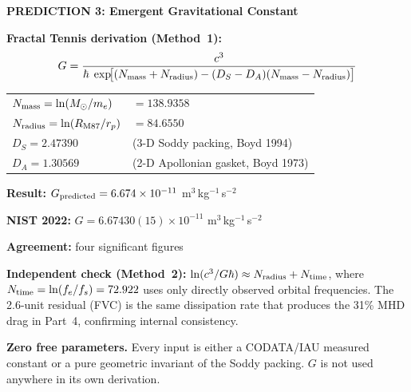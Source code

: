 \documentclass[11pt,a4paper]{article}
\begin{document}
        \begin{mdframed}
        \centering
        \textbf{PREDICTION 3: Emergent Gravitational Constant}

        \vspace{0.5em}

        \textbf{Fractal Tennis derivation (Method~1):}
        \[
        G = \frac{c^3}{\hbar\;\exp\!\bigl[
              (N_{\rm mass}+N_{\rm radius})
              -(D_S-D_A)(N_{\rm mass}-N_{\rm radius})
            \bigr]}
        \]

        \vspace{0.4em}

        \begin{tabular}{ll}
        $N_{\rm mass}   = \ln(M_\odot/m_e)$ & $= 138.9358$ \\
        $N_{\rm radius} = \ln(R_{\rm M87}/r_p)$ & $= 84.6550$ \\
        $D_S = 2.47390$ & (3-D Soddy packing, Boyd 1994) \\
        $D_A = 1.30569$ & (2-D Apollonian gasket, Boyd 1973) \\
        \end{tabular}

        \vspace{0.5em}

        \textbf{Result:}
        $G_{\rm predicted} = 6.674\times10^{-11}$ m$^3$\,kg$^{-1}$\,s$^{-2}$

        \textbf{NIST 2022:}
        $G = 6.67430(15)\times10^{-11}$ m$^3$\,kg$^{-1}$\,s$^{-2}$

        \textbf{Agreement:} four significant figures

        \vspace{0.5em}

        \textbf{Independent check (Method~2):}
        $\ln(c^3/G\hbar) \approx N_{\rm radius} + N_{\rm time}$,
        where $N_{\rm time} = \ln(f_e/f_s) = 72.922$ uses
        only directly observed orbital frequencies.
        The 2.6-unit residual (FVC) is the same dissipation
        rate that produces the 31\% MHD drag in Part~4,
        confirming internal consistency.

        \vspace{0.5em}

        \textbf{Zero free parameters.}
        Every input is either a CODATA/IAU measured constant
        or a pure geometric invariant of the Soddy packing.
        $G$ is not used anywhere in its own derivation.
        \end{mdframed}
\end{document}
